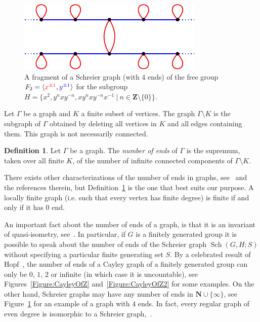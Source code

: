 \documentclass[a4paper]{article}
\theoremstyle{definition}
\newtheorem{defn}[lem]{Definition}
\theoremstyle{remark}
\DeclareMathOperator\Sch{Sch}
\newcommand*{\field}[1]{\mathbf{#1}}
\newcommand*{\Z}{\field{Z}}
\newcommand{\setst}[2]{\{#1\ |\ #2\}}
\begin{document}
%
%
%
%
%
\begin{figure}[htbp]\centering
\includegraphics{SchreierOfF2}
\caption{A fragment of a Schreier graph (with $4$ ends) of the free group $F_2=\langle \textcolor{red}{x^{\pm1}},\textcolor{blue}{y^{\pm1}}\rangle$ for the subgroup $H=\setst{x^2,y^nxy^{-n},xy^nxy^{-n}x^{-1}}{n\in\Z\setminus\{0\}}$.}
\label{Figure:SchreierOfF2}
\end{figure}
%
%

Let $\Gamma$ be a graph and $K$ a finite subset of vertices. The graph $\Gamma\setminus K$ is the subgraph of $\Gamma$ obtained by deleting all vertices in $K$ and all edges containing them. This graph is not necessarily connected.
\begin{defn}\label{Def:Ends}
Let $\Gamma$ be a graph. The \emph{number of ends} of $\Gamma$ is the supremum, taken over all finite $K$, of the number of infinite connected components of $\Gamma\setminus K$.
\end{defn}
There exists other characterizations of the number of ends in graphs, %
see~\cite{MR1967888} and the references therein, but Definition~\ref{Def:Ends} is the one that best suits our purpose.
A locally finite graph (i.e. such that every vertex has finite degree) is finite if and only if it has $0$ end.

An important fact about the number of ends of a graph, is that it is an invariant of quasi-isometry, see~\cite{MR1213151}. In particular, if $G$ is a finitely generated group it is possible to speak about the number of ends of the Schreier graph $\Sch(G,H;S)$ without specifying a particular finite generating set $S$.
By a celebrated result of Hopf~\cite{MR10267}, the number of ends of a Cayley graph of a finitely generated group can only be $0$, $1$, $2$ or infinite (in which case it is uncountable), see Figures~\ref{Figure:CayleyOfZ} and~\ref{Figure:CayleyOfZ2} for some examples.
On the other hand, Schreier graphs may have any number of ends in $\mathbf N\cup\{\infty\}$, see Figure~\ref{Figure:SchreierOfF2} for an example of a graph with $4$ ends.
In fact, every regular graph of even degree is isomorphic to a Schreier graph,~\cite{MR0450121,MR1358635}.
\end{document}
